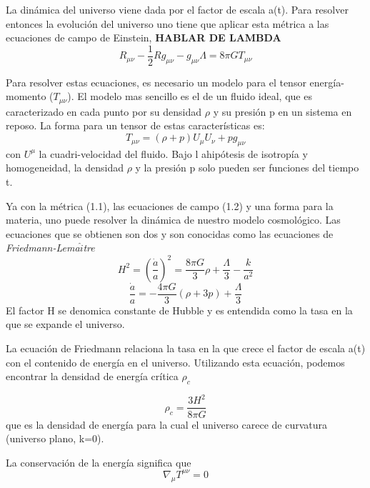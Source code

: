 La din\'amica del universo viene dada por el factor de escala a(t). Para resolver entonces la evoluci\'on del universo uno tiene que aplicar esta m\'etrica a las ecuaciones de campo de Einstein, \textbf{HABLAR DE LAMBDA}
\begin{equation}
      R_{\mu \nu}-\frac{1}{2}Rg_{\mu \nu}-g_ {\mu \nu}\Lambda=8\pi GT_{\mu \nu}
\end{equation}{}

Para resolver estas ecuaciones, es necesario un modelo para el tensor energ\'ia-momento ($T_{\mu \nu}$). El modelo mas sencillo es el de un fluido ideal, que es caracterizado en cada punto por su densidad $\rho$ y su presi\'on p en un sistema en reposo. La forma para un tensor de estas caracter\'isticas es:
\begin{equation}
    T_ {\mu \nu}=(\rho + p)U_{\mu}U_{\nu}+pg_ {\mu \nu}
\end{equation}{}
con $U^{\mu}$ la cuadri-velocidad del fluido. Bajo l ahip\'otesis de isotrop\'ia y homogeneidad, la densidad $\rho$ y la presi\'on p solo pueden ser funciones del tiempo t. 

Ya con la m\'etrica (1.1), las ecuaciones de campo (1.2) y una forma para la materia, uno puede resolver la din\'amica de nuestro modelo cosmol\'ogico. Las ecuaciones que se obtienen son dos y son conocidas como las ecuaciones de \textit{Friedmann-Lema$\hat{i}$tre}
\begin{equation}
    H^{2}=(\frac{\dot{a}}{a})^{2}=\frac{8\pi G}{3}\rho+ \frac{\Lambda}{3}-\frac{k}{a^{2}}
\end{equation}{}
\begin{equation}
\frac{\dot{a}}{a}=-\frac{4\pi G}{3}(\rho+3p)+\frac{\Lambda}{3}    
\end{equation}
El factor H se denomica constante de Hubble y es entendida como la tasa en la que se expande el universo.

La ecuaci\'on de Friedmann relaciona la tasa en la que crece el factor de escala a(t) con el contenido de energ\'ia en el universo. Utilizando esta ecuaci\'on, podemos encontrar la densidad de energ\'ia cr\'itica $\rho_{c}$

\begin{equation}
\rho_ {c}=\frac{3H^{2}}{8\pi G}    
\end{equation}
que es la densidad de energ\'ia para la cual el universo carece de curvatura (universo plano, k=0). 

La conservaci\'on de la energ\'ia significa que 
\begin{equation}
    \nabla_{\mu}T^{\mu \nu}=0
\end{equation}{}


